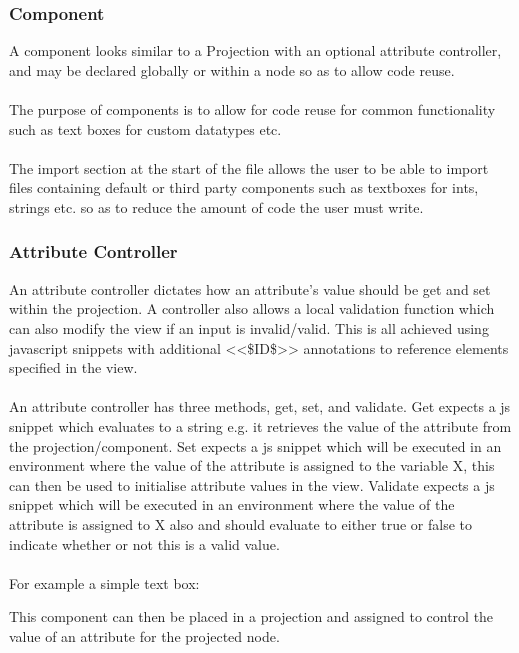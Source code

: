 \documentclass{article}
\begin{document}
\subsubsection{Component}


A component looks similar to a  Projection with an optional attribute controller, and may be declared globally or within a node so as to allow code reuse.
\\
\\
The purpose of components is to allow for code reuse for common functionality such as text boxes for custom datatypes etc.
\\
\\
The import section at the start of the file allows the user to be able to import files containing default or third party components such as textboxes for ints, strings etc. so as to reduce the amount of code the user must write. 

\subsubsection{Attribute Controller}

An attribute controller dictates how an attribute's value should be get and set within the projection. A controller also allows a local validation function which can also modify the view if an input is invalid/valid. This is all achieved using javascript snippets with additional <<\$ID\$>> annotations to reference elements specified in the view.
\\
\\
An attribute controller has three methods, get, set, and validate. Get expects a js snippet which evaluates to a string e.g. it retrieves the value of the attribute from the projection/component. Set expects a js snippet which will be executed in an environment where the value of the attribute is assigned to the variable X, this can then be used to initialise attribute values in the view. Validate expects a js snippet which will be executed in an environment where the value of the attribute is assigned to X also and should evaluate to either true or false to indicate whether or not this is a valid value. 
\\
\\
For example a simple text box: 

This component can then be placed in a projection and assigned to control the value of an attribute for the projected node.
\end{document}
